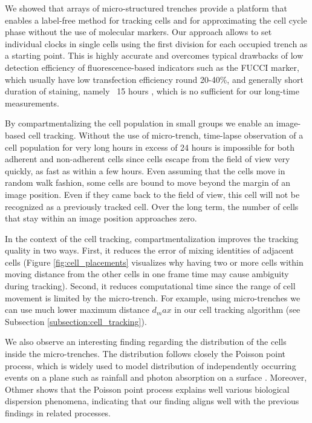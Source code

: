 \documentclass[pdftex,12pt,a4paper]{report}
\begin{document}
We showed that arrays of micro-structured trenches provide a platform that enables a label-free method for tracking cells and for approximating the cell cycle phase without the use of molecular markers. Our approach allows to set individual clocks in single cells using the first division for each occupied trench as a starting point. This is highly accurate and overcomes typical drawbacks of low detection efficiency of fluorescence-based indicators such as the FUCCI marker, which usually have low transfection efficiency round 20-40\%, and generally short duration of staining, namely ~15 hours \cite{zielke2015fucci}, which is no sufficient for our long-time measurements.

By compartmentalizing the cell population in small groups we enable an image-based cell tracking. Without the use of micro-trench, time-lapse observation of a cell population for very long hours in excess of 24 hours is impossible for both adherent and non-adherent cells since cells escape from the field of view very quickly, as fast as within a few hours. Even assuming that the cells move in random walk fashion, some cells are bound to move beyond the margin of an image position. Even if they came back to the field of view, this cell will not be recognized as a previously tracked cell. Over the long term, the number of cells that stay within an image position approaches zero.

In the context of the cell tracking, compartmentalization improves the tracking quality in two ways. First, it reduces the error of mixing identities of adjacent cells (Figure \ref{fig:cell_placements} visualizes why having two or more cells within moving distance from the other cells in one frame time may cause ambiguity during tracking). Second, it reduces computational time since the range of cell movement is limited by the micro-trench. For example, using micro-trenches we can use much lower maximum distance $d_max$ in our cell tracking algorithm (see Subsection \ref{subsection:cell_tracking}).

We also observe an interesting finding regarding the distribution of the cells inside the micro-trenches. The distribution follows closely the Poisson point process, which is widely used to model distribution of independently occurring events on a plane such as rainfall \cite{rodriguez1987some} and photon absorption on a surface \cite{scargle1998studies}. Moreover, Othmer \cite{othmer1988models} shows that the Poisson point process explains well various biological dispersion phenomena, indicating that our finding aligns well with the previous findings in related processes.
\end{document}
